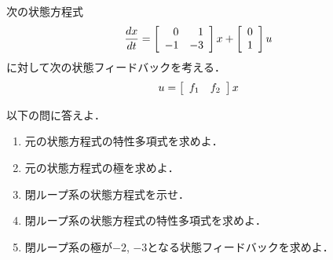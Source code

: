 \item
次の状態方程式
\begin{align}
	\frac{dx}{dt} 
	& =	\bmatrix{rr}
			0 & 1  \\
			-1 & -3 
		\ematrix
		x
		+
		\bmatrix{c}
			0 \\
			1
		\ematrix
		u 
\nonumber
\end{align}
に対して次の状態フィードバックを考える．
\begin{align}
	u & = \bmatrix{ccc} f_1 & f_2 \ematrix x
\nonumber
\end{align}

以下の問に答えよ．
\begin{enumerate}
\item
元の状態方程式の特性多項式を求めよ．
\vspace{3cm}

\item
元の状態方程式の極を求めよ．
\vspace{3cm}

\item
閉ループ系の状態方程式を示せ．
\vspace{4cm}

\item
閉ループ系の状態方程式の特性多項式を求めよ．
\vspace{3cm}

\item
閉ループ系の極が$-2$, $-3$となる状態フィードバックを求めよ．

\end{enumerate}
